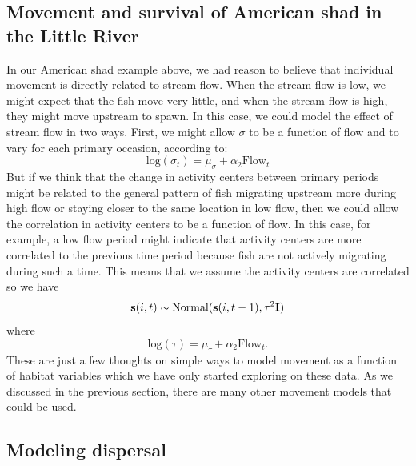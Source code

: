 \subsection{Movement and survival of American shad in the Little River}

In our American shad example above, we had reason to believe that
individual movement is directly related to stream flow.  When the
stream flow is low, we might expect that the fish move very little,
and when the stream flow is high, they might move upstream to
spawn. In this case, we could model the effect of stream flow in two
ways.  First, we might allow $\sigma$ to be a function of flow and to
vary for each primary occasion, according to:
\[
 \mbox{log}(\sigma_t) = \mu_{\sigma} + \alpha_2 \mbox{Flow}_t
\]
But if we think that the change in activity centers between primary
periods might be related to the general pattern of fish migrating
upstream more during high flow or staying closer to the same location
in low flow, then we could allow the correlation in activity centers
to be a function of flow.  In this case, for example, a low flow
period might indicate that activity centers are more correlated to the
previous time period because fish are not actively migrating during
such a time.  This means that we assume the activity centers are
correlated so we have
\[
{\bf s}(i,t) \sim \mbox{Normal}({\bf
  s}(i,t-1), \tau^{2} {\bf I})
\]
where
\[
\mbox{log}(\tau) = \mu_{\tau} + \alpha_2 \mbox{Flow}_t.
\]
These are just a few thoughts on simple ways to model movement as a
function of habitat variables which we have only started exploring on
these data.  As we discussed in the previous section, there are many
other movement models that could be used.

\subsection{Modeling  dispersal}

